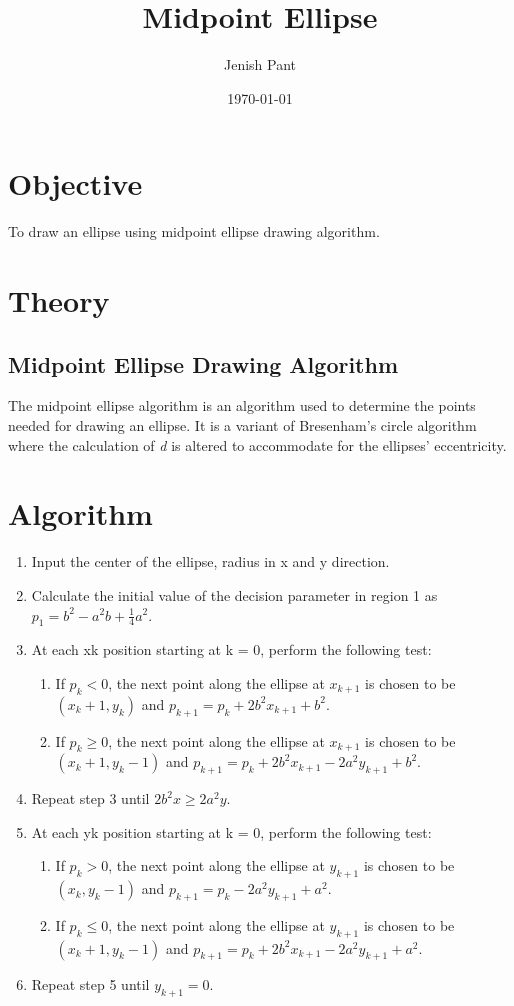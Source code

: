 \documentclass[12pt]{article}
\begin{document}
	\title{Midpoint Ellipse}
	\author{Jenish Pant}
	\date{\today}
	\maketitle

	\section{Objective}
	To draw an ellipse using midpoint ellipse drawing algorithm.
	\section{Theory}
	\subsection{Midpoint Ellipse Drawing Algorithm}
	The midpoint ellipse algorithm is an algorithm used to determine the points needed for drawing an ellipse. It is a variant of Bresenham's circle algorithm where the calculation of \textit{d} is altered to accommodate for the ellipses' eccentricity.

	\section{Algorithm}
	\begin{enumerate}
		\item Input the center of the ellipse, radius in x and y direction.
		\item Calculate the initial value of the decision parameter in region 1 as $p_1 = b^2 - a^2b + \frac{1}{4}a^2$.
		\item At each xk position starting at k = 0, perform the following test:
		\begin{enumerate}
			\item If $p_k < 0$, the next point along the ellipse at $x_{k+1}$ is chosen to be $(x_k + 1, y_k)$ and $p_{k+1} = p_k + 2b^2x_{k+1} + b^2$.
			\item If $p_k \geq 0$, the next point along the ellipse at $x_{k+1}$ is chosen to be $(x_k + 1, y_k - 1)$ and $p_{k+1} = p_k + 2b^2x_{k+1} - 2a^2y_{k+1} + b^2$.
		\end{enumerate}
		\item Repeat step 3 until $2b^2x \geq 2a^2y$.
		\item At each yk position starting at k = 0, perform the following test:
		\begin{enumerate}
			\item If $p_k > 0$, the next point along the ellipse at $y_{k+1}$ is chosen to be $(x_k, y_k - 1)$ and $p_{k+1} = p_k - 2a^2y_{k+1} + a^2$.
			\item If $p_k \leq 0$, the next point along the ellipse at $y_{k+1}$ is chosen to be $(x_k + 1, y_k - 1)$ and $p_{k+1} = p_k + 2b^2x_{k+1} - 2a^2y_{k+1} + a^2$.
		\end{enumerate}
		\item Repeat step 5 until $y_{k+1} = 0$.
	\end{enumerate}
\end{document}
